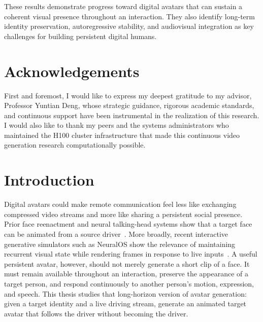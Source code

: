 \documentclass[12pt,letterpaper]{report}
\begin{document}
These results demonstrate progress toward digital avatars that can sustain a coherent visual presence throughout an interaction. They also identify long-term identity preservation, autoregressive stability, and audiovisual integration as key challenges for building persistent digital humans.

\chapter*{Acknowledgements}
First and foremost, I would like to express my deepest gratitude to my advisor, Professor Yuntian Deng, whose strategic guidance, rigorous academic standards, and continuous support have been instrumental in the realization of this research. I would also like to thank my peers and the systems administrators who maintained the H100 cluster infrastructure that made this continuous video generation research computationally possible.

\tableofcontents

\listoffigures

\listoftables

\clearpage


\chapter{Introduction}

Digital avatars could make remote communication feel less like exchanging compressed video streams and more like sharing a persistent social presence. Prior face reenactment and neural talking-head systems show that a target face can be animated from a source driver~\cite{thies2016face, wang2021facevid2vid, drobyshev2022megaportraits}. More broadly, recent interactive generative simulators such as NeuralOS show the relevance of maintaining recurrent visual state while rendering frames in response to live inputs~\cite{rivard2026neuralos}. A useful persistent avatar, however, should not merely generate a short clip of a face. It must remain available throughout an interaction, preserve the appearance of a target person, and respond continuously to another person's motion, expression, and speech. This thesis studies that long-horizon version of avatar generation: given a target identity and a live driving stream, generate an animated target avatar that follows the driver without becoming the driver.
\end{document}

